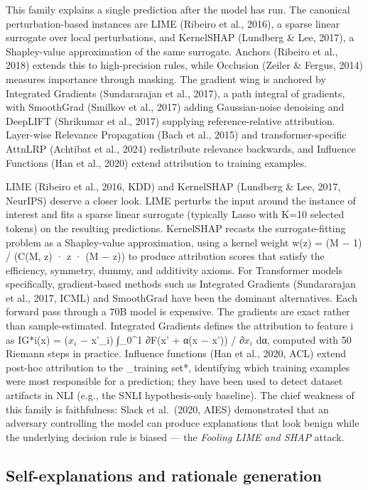 This family explains a single prediction after the model has run. The canonical perturbation-based instances are LIME (Ribeiro et al., 2016), a sparse linear surrogate over local perturbations, and KernelSHAP (Lundberg \& Lee, 2017), a Shapley-value approximation of the same surrogate. Anchors (Ribeiro et al., 2018) extends this to high-precision rules, while Occlusion (Zeiler \& Fergus, 2014) measures importance through masking. The gradient wing is anchored by Integrated Gradients (Sundararajan et al., 2017), a path integral of gradients, with SmoothGrad (Smilkov et al., 2017) adding Gaussian-noise denoising and DeepLIFT (Shrikumar et al., 2017) supplying reference-relative attribution. Layer-wise Relevance Propagation (Bach et al., 2015) and transformer-specific AttnLRP (Achtibat et al., 2024) redistribute relevance backwards, and Influence Functions (Han et al., 2020) extend attribution to training examples.

LIME (Ribeiro et al., 2016, KDD) and KernelSHAP (Lundberg \& Lee, 2017, NeurIPS) deserve a closer look. LIME perturbs the input around the instance of interest and fits a sparse linear surrogate (typically Lasso with K=10 selected tokens) on the resulting predictions. KernelSHAP recasts the surrogate-fitting problem as a Shapley-value approximation, using a kernel weight w(z) = (M − 1) / (C(M, \textbar z\textbar) · \textbar z\textbar{} · (M − \textbar z\textbar)) to produce attribution scores that satisfy the efficiency, symmetry, dummy, and additivity axioms. For Transformer models specifically, gradient-based methods such as Integrated Gradients (Sundararajan et al., 2017, ICML) and SmoothGrad have been the dominant alternatives. Each forward pass through a 70B model is expensive. The gradients are exact rather than sample-estimated. Integrated Gradients defines the attribution to feature i as IG*i(x) = (\(x_i\) − x'\_i) ∫\_0\^{}1 ∂F(x' + α(x − x')) / ∂\(x_i\) dα, computed with 50 Riemann steps in practice. Influence functions (Han et al., 2020, ACL) extend post-hoc attribution to the \_training set*, identifying which training examples were most responsible for a prediction; they have been used to detect dataset artifacts in NLI (e.g., the SNLI hypothesis-only baseline). The chief weakness of this family is faithfulness: Slack et al.~(2020, AIES) demonstrated that an adversary controlling the model can produce explanations that look benign while the underlying decision rule is biased --- the \emph{Fooling LIME and SHAP} attack.

\subsection{Self-explanations and rationale generation}\label{self-explanations-and-rationale-generation}

